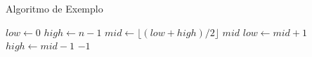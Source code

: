 

\begin{algorithm}
\caption{Algoritmo de Exemplo}
\label{alg:exemplo}
\begin{algorithmic}[1]
    \State $low \gets 0$
    \State $high \gets n - 1$
        \State $mid \gets \lfloor (low + high) / 2 \rfloor$
            \State \Return $mid$
            \State $low \gets mid + 1$
        \Else
            \State $high \gets mid - 1$
        \EndIf
    \EndWhile
    \State \Return $-1$
\EndProcedure
\end{algorithmic}
\end{algorithm}







